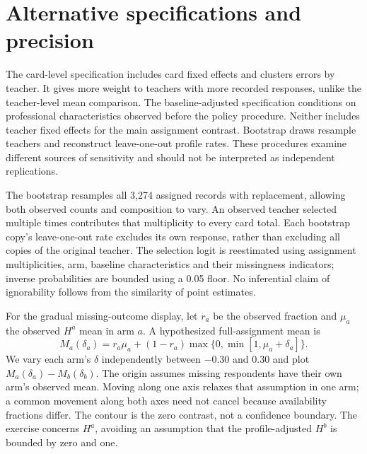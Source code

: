 \section{Alternative specifications and precision}
The card-level specification includes card fixed effects and clusters errors by teacher. It gives more weight to teachers with more recorded responses, unlike the teacher-level mean comparison. The baseline-adjusted specification conditions on professional characteristics observed before the policy procedure. Neither includes teacher fixed effects for the main assignment contrast. Bootstrap draws resample teachers and reconstruct leave-one-out profile rates. These procedures examine different sources of sensitivity and should not be interpreted as independent replications.
\begin{addition}
The bootstrap resamples all 3,274 assigned records with replacement, allowing both observed counts and composition to vary. An observed teacher selected multiple times contributes that multiplicity to every card total. Each bootstrap copy's leave-one-out rate excludes its own response, rather than excluding all copies of the original teacher. The selection logit is reestimated using assignment multiplicities, arm, baseline characteristics and their missingness indicators; inverse probabilities are bounded using a 0.05 floor. No inferential claim of ignorability follows from the similarity of point estimates.

For the gradual missing-outcome display, let $r_a$ be the observed fraction and $\mu_a$ the observed $H^a$ mean in arm $a$. A hypothesized full-assignment mean is
\[
M_a(\delta_a)=r_a\mu_a+(1-r_a)\max\{0,\min[1,\mu_a+\delta_a]\}.
\]
We vary each arm's $\delta$ independently between $-0.30$ and 0.30 and plot $M_a(\delta_a)-M_b(\delta_b)$. The origin assumes missing respondents have their own arm's observed mean. Moving along one axis relaxes that assumption in one arm; a common movement along both axes need not cancel because availability fractions differ. The contour is the zero contrast, not a confidence boundary. The exercise concerns $H^a$, avoiding an assumption that the profile-adjusted $H^b$ is bounded by zero and one.
\end{addition}

